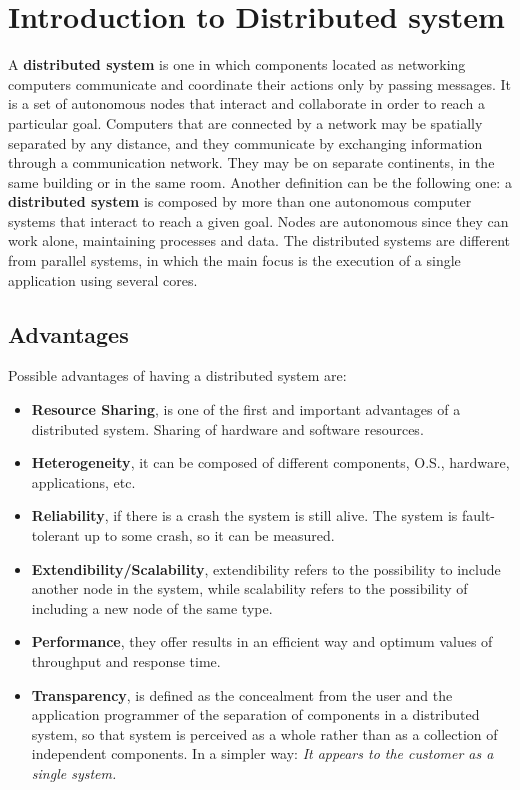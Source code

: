 \section{Introduction to Distributed system}
A \textbf{distributed system} is one in which components located as networking computers
communicate and coordinate their actions only by passing messages. It is a set of autonomous nodes that interact and collaborate in order to reach a particular goal. Computers that are connected by a network may be spatially separated by any distance, and they communicate by exchanging information through a communication network. They may be on separate continents, in the same building or in the same room.
Another definition can be the following one: a \textbf{distributed system} is composed by more than one autonomous computer systems that interact to reach a given goal. Nodes are autonomous since they can work alone, maintaining processes and data.
The distributed systems are different from parallel systems, in which the main focus is the execution of a single application using several cores.
  
\subsection{Advantages}
Possible advantages of having a distributed system are:
\begin{itemize}
    \item \textbf{Resource Sharing}, is one of the first and important advantages of a distributed system. Sharing of hardware and software resources. 
    \item \textbf{Heterogeneity}, it can be composed of different components, O.S., hardware, applications, etc.
    \item \textbf{Reliability}, if there is a crash the system is still alive. The system is fault-tolerant up to some crash, so it can be measured.
    \item \textbf{Extendibility/Scalability}, extendibility refers to the possibility to include another node in the system, while scalability refers to the possibility of including a new node of the same type.
    \item \textbf{Performance}, they offer results in an efficient way and optimum values of throughput and response time.
    \item \textbf{Transparency}, is defined as the concealment from the user and the application programmer of the separation of components in a distributed system, so that system is perceived as a whole rather than as a collection of independent components. In a simpler way: \textit{It appears to the customer as a single system.}
\end{itemize}

